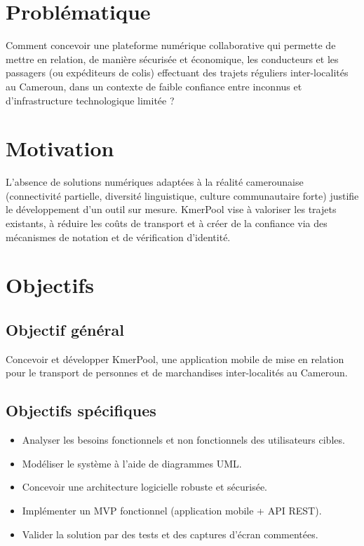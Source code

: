 \documentclass[12pt, a4paper]{report}
\begin{document}
\section*{Problématique}
Comment concevoir une plateforme numérique collaborative qui permette de mettre en
relation, de manière sécurisée et économique, les conducteurs et les passagers (ou
expéditeurs de colis) effectuant des trajets réguliers inter-localités au Cameroun,
dans un contexte de faible confiance entre inconnus et d'infrastructure technologique
limitée ?

\section*{Motivation}
L'absence de solutions numériques adaptées à la réalité camerounaise (connectivité
partielle, diversité linguistique, culture communautaire forte) justifie le développement
d'un outil sur mesure. KmerPool vise à valoriser les trajets existants, à réduire les
coûts de transport et à créer de la confiance via des mécanismes de notation et de
vérification d'identité.

\section*{Objectifs}

\subsection*{Objectif général}
Concevoir et développer KmerPool, une application mobile de mise en relation pour le
transport de personnes et de marchandises inter-localités au Cameroun.

\subsection*{Objectifs spécifiques}
\begin{itemize}
  \item Analyser les besoins fonctionnels et non fonctionnels des utilisateurs cibles.
  \item Modéliser le système à l'aide de diagrammes \ac{UML}.
  \item Concevoir une architecture logicielle robuste et sécurisée.
  \item Implémenter un \ac{MVP} fonctionnel (application mobile + \ac{API} \ac{REST}).
  \item Valider la solution par des tests et des captures d'écran commentées.
\end{itemize}
\end{document}
